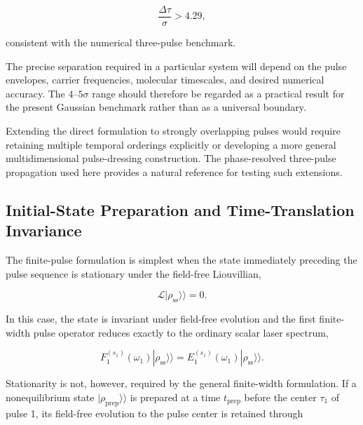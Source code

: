 \documentclass[11pt]{article}
\begin{document}
\begin{equation}
\frac{
\Delta\tau
}{
\sigma
}
>
4.29,
\end{equation}

consistent with the numerical three-pulse benchmark.

The precise separation required in a particular system will depend on
the pulse envelopes, carrier frequencies, molecular timescales, and
desired numerical accuracy.  The $4$--$5\sigma$ range should therefore
be regarded as a practical result for the present Gaussian benchmark
rather than as a universal boundary.

Extending the direct formulation to strongly overlapping pulses would
require retaining multiple temporal orderings explicitly or developing
a more general multidimensional pulse-dressing construction.  The
phase-resolved three-pulse propagation used here provides a natural
reference for testing such extensions.

\subsection{Initial-State Preparation and Time-Translation Invariance}
\label{subsec:initial_state_limitation}

The finite-pulse formulation is simplest when the state immediately
preceding the pulse sequence is stationary under the field-free
Liouvillian,

\begin{equation}
\mathcal{L}
|\rho_{\mathrm{ss}}\rangle\rangle
=
0.
\end{equation}

In this case, the state is invariant under field-free evolution and
the first finite-width pulse operator reduces exactly to the ordinary
scalar laser spectrum,

\begin{equation}
F_1^{(s_1)}(\omega_1)
|\rho_{\mathrm{ss}}\rangle\rangle
=
E_1^{(s_1)}(\omega_1)
|\rho_{\mathrm{ss}}\rangle\rangle.
\end{equation}

Stationarity is not, however, required by the general finite-width
formulation. If a nonequilibrium state
$|\rho_{\mathrm{prep}}\rangle\rangle$ is prepared at a time
$t_{\mathrm{prep}}$ before the center $\tau_1$ of pulse 1, its
field-free evolution to the pulse center is retained through
\end{document}
